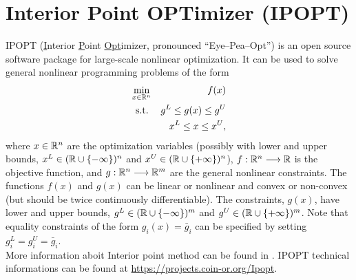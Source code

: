 
\section{Interior Point OPTimizer (IPOPT)}
\label{AppC}



IPOPT (\underline{I}nterior \underline{P}oint \underline{Opt}imizer,
pronounced ``Eye--Pea--Opt'') is an open source software package for
large-scale nonlinear optimization. It can be used to solve general
nonlinear programming problems of the form
\begin{eqnarray*}
\min_{x\in\mathbb{R}^n} &&f(x) \label{eq:obj} \\
\mbox{s.t.} \;  &&g^L \leq g(x) \leq g^U \label{eq:constraints}\\
                &&x^L \leq x \leq x^U, \label{eq:bounds}
\end{eqnarray*}
where $x \in \mathbb{R}^n$ are the optimization variables (possibly with
lower and upper bounds, $x^L\in(\mathbb{R}\cup\{-\infty\})^n$ and
$x^U\in(\mathbb{R}\cup\{+\infty\})^n$), $f:\mathbb{R}^n\longrightarrow\mathbb{R}$ is the
objective function, and $g:\mathbb{R}^n\longrightarrow \mathbb{R}^m$ are the general
nonlinear constraints.  The functions $f(x)$ and $g(x)$ can be linear
or nonlinear and convex or non-convex (but should be twice
continuously differentiable). The constraints, $g(x)$, have lower and
upper bounds, $g^L\in(\mathbb{R}\cup\{-\infty\})^m$ and
$g^U\in(\mathbb{R}\cup\{+\infty\})^m$. Note that equality constraints of the
form $g_i(x)=\bar g_i$ can be specified by setting
$g^L_{i}=g^U_{i}=\bar g_i$. \\

More information aboit Interior point method can be found in \cite{polik2010interior}.
IPOPT technical informations can be found at \url{https://projects.coin-or.org/Ipopt}.

